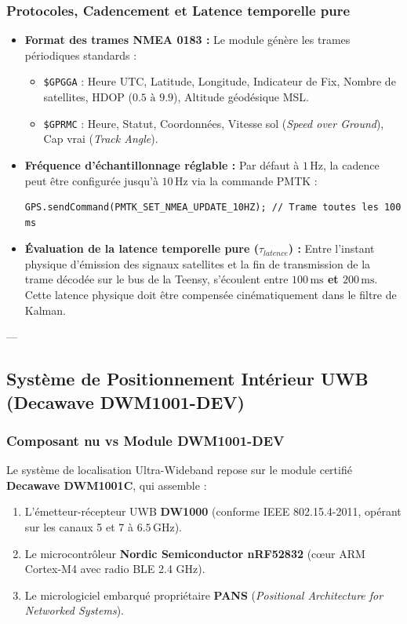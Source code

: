 \documentclass[../Materiel.tex]{subfiles}
\begin{document}
\subsubsection{Protocoles, Cadencement et Latence temporelle pure}
\begin{itemize}
    \item \textbf{Format des trames NMEA 0183 :} Le module génère les trames périodiques standards :
    \begin{itemize}
        \item \texttt{\$GPGGA} : Heure UTC, Latitude, Longitude, Indicateur de Fix, Nombre de satellites, HDOP ($0.5\text{ à }9.9$), Altitude géodésique MSL.
        \item \texttt{\$GPRMC} : Heure, Statut, Coordonnées, Vitesse sol (\textit{Speed over Ground}), Cap vrai (\textit{Track Angle}).
    \end{itemize}
    \item \textbf{Fréquence d'échantillonnage réglable :}
    Par défaut à $1\,\text{Hz}$, la cadence peut être configurée jusqu'à \textbf{$10\,\text{Hz}$} via la commande PMTK :
\begin{lstlisting}
GPS.sendCommand(PMTK_SET_NMEA_UPDATE_10HZ); // Trame toutes les 100 ms
\end{lstlisting}
    \item \textbf{Évaluation de la latence temporelle pure ($\tau_{latence}$) :}
    Entre l'instant physique d'émission des signaux satellites et la fin de transmission de la trame décodée sur le bus de la Teensy, s'écoulent entre \textbf{$100\,\text{ms}$ et $200\,\text{ms}$}. Cette latence physique doit être compensée cinématiquement dans le filtre de Kalman.
\end{itemize}

---

\subsection{Système de Positionnement Intérieur UWB (Decawave DWM1001-DEV)}

\subsubsection{Composant nu vs Module DWM1001-DEV}
Le système de localisation Ultra-Wideband repose sur le module certifié \textbf{Decawave DWM1001C}, qui assemble :
\begin{enumerate}
    \item L'émetteur-récepteur UWB \textbf{DW1000} (conforme IEEE 802.15.4-2011, opérant sur les canaux 5 et 7 à $6.5\,\text{GHz}$).
    \item Le microcontrôleur \textbf{Nordic Semiconductor nRF52832} (cœur ARM Cortex-M4 avec radio BLE 2.4 GHz).
    \item Le micrologiciel embarqué propriétaire \textbf{PANS} (\textit{Positional Architecture for Networked Systems}).
\end{enumerate}
\end{document}
